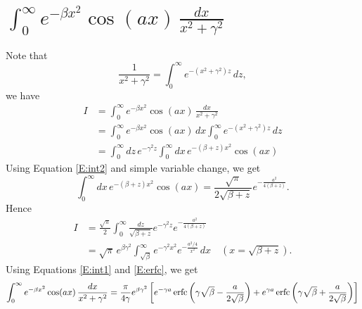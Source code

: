 \section{ $ \int_0^{\infty} e^{-\beta x^2} \cos(a x) \, \frac{dx}{x^2+\gamma^2} $ }
Note that
\[
  \frac{1}{x^2+\gamma^2} = \int_0^{\infty} e^{-(x^2+\gamma^2) z} \, dz,
\]
we have
\begin{align*}
  I &= \int_0^{\infty} e^{-\beta x^2} \cos(a x) \, \frac{dx}{x^2+\gamma^2}  \\
    &= \int_0^{\infty} e^{-\beta x^2} \cos(a x) \, dx 
         \int_0^{\infty} e^{-(x^2+\gamma^2) z} \, dz   \\
    &= \int_0^{\infty} dz\, e^{-\gamma^2 z} 
         \int_0^{\infty} dx\, e^{-(\beta+z)x^2} \cos(a x)
\end{align*}
Using Equation \ref{E:int2} and simple variable change, we get
\[
  \int_0^{\infty} dx\, e^{-(\beta+z)x^2} \cos(a x) 
    = \frac{\sqrt{\pi}}{2\sqrt{\beta+z}} e^{-\frac{a^2}{4(\beta+z)}}.
\]
Hence
\begin{align*}
  I &= \frac{\sqrt{\pi}}{2} \int_0^{\infty} \frac{dz}{\sqrt{\beta+z}}
                                e^{-\gamma^2 z} e^{-\frac{a^2}{4(\beta+z)}}  \\
    &= \sqrt{\pi}\, e^{\beta \gamma^2} 
       \int_{\sqrt{\beta}}^{\infty} e^{-\gamma^2 x^2} e^{-\frac{a^2/4}{x^2}}\,dx
         \quad (x=\sqrt{\beta+z}).
\end{align*}
Using Equations \ref{E:int1} and \ref{E:erfc}, we get
\begin{equation} \label{E:int3}
  \int_0^{\infty} e^{-\beta x^2} \cos(a x) \, \frac{dx}{x^2+\gamma^2} 
    = \frac{\pi}{4\gamma} e^{\beta \gamma^2}
      \left[
        e^{-\gamma a} 
          \operatorname*{erfc} \left( \gamma \sqrt{\beta} - \frac{a}{2\sqrt{\beta}} \right)
        + e^{\gamma a} 
          \operatorname*{erfc} \left( \gamma \sqrt{\beta} + \frac{a}{2\sqrt{\beta}} \right)
      \right]
\end{equation}


